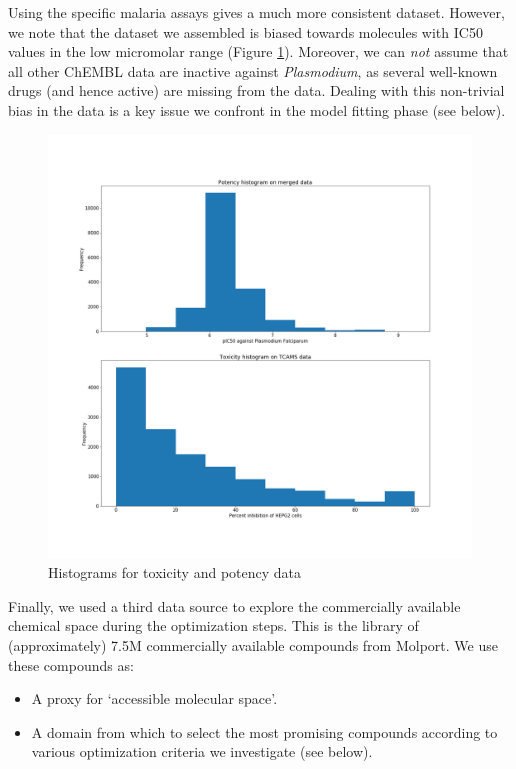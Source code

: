 \documentclass{article}
\begin{document}
Using the specific malaria assays gives a much more consistent dataset.  However, we note that the dataset we assembled is biased towards molecules with IC50 values in the low micromolar range (Figure \ref{fig:hist}). 
Moreover, we can \textit{not} assume that all other ChEMBL data are inactive against \textit{Plasmodium}, as several well-known drugs (and hence active) are missing from the data. Dealing with this non-trivial bias in the data is a key issue we confront in the model fitting phase (see below).\newline

\begin{figure}[h!]
\centering
\includegraphics[width=\textwidth]{fig1_hists.png}
\caption{Histograms for toxicity and potency data}
\label{fig:hist}
\end{figure}

\newline
Finally, we used a third data source to explore the commercially available chemical space during the optimization steps.  This is the library of (approximately) 7.5M commercially available compounds from Molport.  We use these compounds as: \begin{itemize}
    \item A proxy for `accessible molecular space'.
    \item A domain from which to select the most promising compounds according to various optimization criteria we investigate (see below).
\end{itemize}
\end{document}
